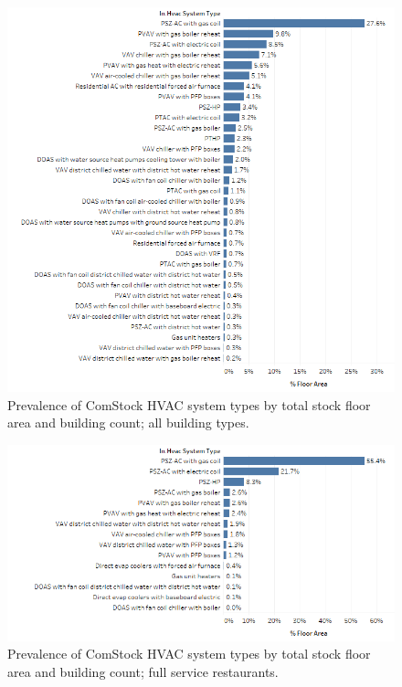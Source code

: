 \begin{figure}
    \centering \includegraphics[width=1.0\textwidth]{figures/hvac_system_type_prevalance.png}
    \caption[HVAC system type prevalence in all building types]{Prevalence of ComStock HVAC system types by total stock floor area and building count; all building types.}
    \label{fig:hvac_sys_type_prevalence}
\end{figure}

\begin{figure}
    \centering \includegraphics[width=1.0\textwidth]{figures/HVAC_SYS_Type_PREV_FSR.png}
    \caption[HVAC system type prevalence in full service restaurants]{Prevalence of ComStock HVAC system types by total stock floor area and building count; full service restaurants.}
    \label{fig:hvac_sys_type_prevalence_fsr}
\end{figure}

